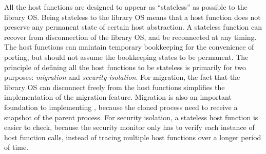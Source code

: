 All the host functions are designed to appear as ``stateless''
as possible to the library OS.
Being stateless to the library OS means that
a host function does not preserve any permanent state of certain host abstraction.
A stateless function can recover
from disconnection of the library OS, and be reconnected at any timing.
The host functions can maintain temporary bookkeeping for the convenience of porting,
but should not assume the bookkeeping states to be permanent.
The principle of defining all the host functions to be stateless
is primarily for two purposes:
{\em migration} and {\em security isolation}.
For migration, the fact that the library OS can disconnect freely from the host functions simplifies the implementation of the migration feature.
Migration is also an important foundation to implementing , because the cloned process need to receive a snapshot of the parent process.
For security isolation, 
a stateless host function is easier to check,
because the security monitor only has to verify each instance of host function calls,
instead of tracing multiple host functions over a longer period of time.






